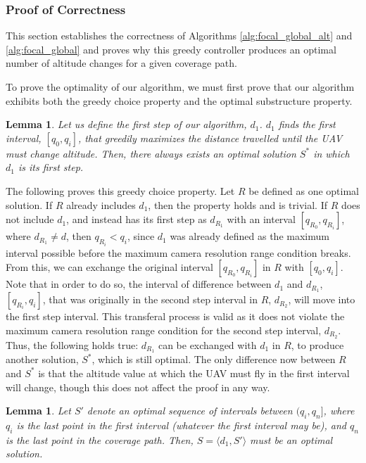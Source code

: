 \documentclass[conference]{IEEEtran}
\theoremstyle{plain}%
\newtheorem{lemma}[theorem]{Lemma}
\begin{document}
\subsubsection{Proof of Correctness}
This section establishes the correctness of Algorithms \ref{alg:focal_global_alt} and \ref{alg:focal_global} and proves why this greedy controller produces an optimal number of altitude changes for a given coverage path.

To prove the optimality of our algorithm, we must first prove that our algorithm exhibits both the greedy choice property and the optimal substructure property.
\begin{lemma} %
Let us define the first step of our algorithm, $d_1$. $d_1$ finds the first interval, $[q_0, q_i]$, that greedily maximizes the distance travelled until the UAV must change altitude. Then, there always exists an optimal solution $S^*$ in which $d_1$ is its first step.
\end{lemma}
The following proves this greedy choice property. Let $R$ be defined as one optimal solution. If $R$ already includes $d_1$, then the property holds and is trivial. If $R$ does not include $d_1$, and instead has its first step as $d_{R_1}$ with an interval $[q_{R_0}, q_{R_i}]$, where $d_{R_1} \neq d$, then $q_{R_i} < q_i$, since $d_1$ was already defined as the maximum interval possible before the maximum camera resolution range condition breaks. From this, we can exchange the original interval $[q_{R_0}, q_{R_i}]$ in $R$ with $[q_0, q_i]$. Note that in order to do so, the interval of difference between $d_1$ and $d_{R_1}$, $[q_{R_i}, q_i]$, that was originally in the second step interval in $R$, $d_{R_2}$, will move into the first step interval. This transferal process is valid as it does not violate the maximum camera resolution range condition for the second step interval, $d_{R_2}$. Thus, the following holds true: $d_{R_1}$ can be exchanged with $d_1$ in $R$, to produce another solution, $S^*$, which is still optimal. The only difference now between $R$ and $S^*$ is that the altitude value at which the UAV must fly in the first interval will change, though this does not affect the proof in any way.
\begin{lemma} %
Let $S'$ denote an optimal sequence of intervals between $(q_i, q_n]$, where $q_i$ is the last point in the first interval (whatever the first interval may be), and $q_n$ is the last point in the coverage path. Then, $S = \langle d_1, S' \rangle$ must be an optimal solution.
\end{lemma}
\end{document}
